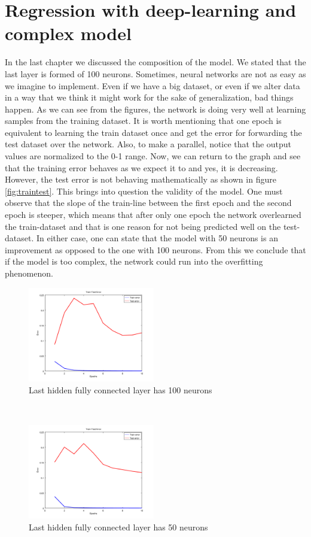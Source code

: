 \section{Regression with deep-learning and complex model}
In the last chapter we discussed the composition of the model. We stated that the last layer is formed of 100 neurons. Sometimes, neural networks are not as easy as we imagine to implement. Even if we have a big dataset, or even if we alter data in a way that we think it might work for the sake of generalization, bad things happen. As we can see from the figures, the network is doing very well at learning samples from the training dataset. It is worth mentioning that one epoch is equivalent to learning the train dataset once and get the error for forwarding the test dataset over the network. Also, to make a parallel, notice that the output values are normalized to the 0-1 range. Now, we can return to the graph and see that the training error behaves as we expect it to and yes, it is decreasing. However, the test error is not behaving mathematically as shown in figure \ref{fig:traintest}. This brings into question the validity of the model. One must observe that the slope of the train-line between the first epoch and the second epoch is steeper, which means that after only one epoch the network overlearned the train-dataset and that is one reason for not being predicted well on the test-dataset. In either case, one can state that the model with 50 neurons is an improvement as opposed to the one with 100 neurons. From this we conclude that if the model is too complex, the network could run into the overfitting phenomenon.
\begin{figure}[h]
	\begin{center}
		\includegraphics[width=209px,height=157px]{src/img/results/train-test-100}
		\caption{Last hidden fully connected layer has 100 neurons} \label{fig:50tt}
    \end{center}
\end{figure}
~\\
\begin{figure}[h]
	\begin{center}
		\includegraphics[width=209px,height=157px]{src/img/results/train-test-50}
		\caption{Last hidden fully connected layer has 50 neurons} \label{fig:100tt}
    \end{center}
\end{figure}

